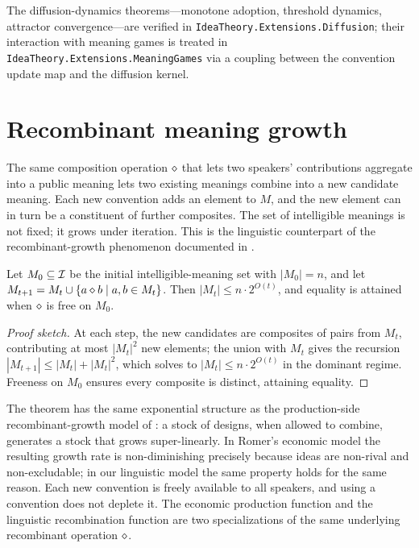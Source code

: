\formalstatus The diffusion-dynamics theorems---monotone adoption,
threshold dynamics, attractor convergence---are verified in
\texttt{IdeaTheory.Extensions.Diffusion}; their interaction with
meaning games is treated in
\texttt{IdeaTheory.Extensions.MeaningGames} via a coupling between
the convention update map and the diffusion kernel.

\section{Recombinant meaning growth}\label{sec:recombinant}

The same composition operation $\mathbin{\diamond}$ that lets two speakers'
contributions aggregate into a public meaning lets two existing
meanings combine into a new candidate meaning. Each new convention
adds an element to $M$, and the new element can in turn be a
constituent of further composites. The set of intelligible meanings is
not fixed; it grows under iteration. This is the linguistic counterpart
of the recombinant-growth phenomenon documented in
\cite{Weitzman1998}.

\begin{theorem}\label{thm:recombinant}
Let $M_0\subseteq\mathcal{I}$ be the initial intelligible-meaning set with
$|M_0|=n$, and let $M_{t+1}=M_t\cup\{a\mathbin{\diamond} b\mid a,b\in M_t\}$.
Then $|M_t|\leq n\cdot 2^{O(t)}$, and equality is attained when
$\mathbin{\diamond}$ is free on $M_0$.
\end{theorem}

\begin{proof}[Proof sketch]
At each step, the new candidates are composites of pairs from
$M_t$, contributing at most $|M_t|^2$ new elements; the union with
$M_t$ gives the recursion $|M_{t+1}|\leq|M_t|+|M_t|^2$, which
solves to $|M_t|\leq n\cdot 2^{O(t)}$ in the dominant regime. Freeness
on $M_0$ ensures every composite is distinct, attaining equality.
\end{proof}

The theorem has the same exponential structure as the production-side
recombinant-growth model of \cite{Romer1990}: a stock of designs,
when allowed to combine, generates a stock that grows
super-linearly. In Romer's economic model the resulting growth rate is
non-diminishing precisely because ideas are non-rival and
non-excludable; in our linguistic model the same property holds for
the same reason. Each new convention is freely available to all
speakers, and using a convention does not deplete it. The economic
production function and the linguistic recombination function are
two specializations of the same underlying recombinant
operation $\mathbin{\diamond}$.

